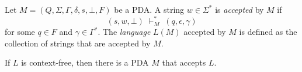 \begin{definition}
  Let $M = (Q, \Sigma, \Gamma, \delta, s, \mathord\perp, F)$ be a
  PDA.
  A string $w \in \Sigma^*$ is \emph{accepted} by $M$ if
  \begin{equation*}
    (s, w, \mathord\perp)
    \; \mathop\vdash\nolimits_M^* \;
    (q, \epsilon, \gamma)
  \end{equation*}
  for some $q \in F$ and $\gamma \in \Gamma^*$.
  The \emph{language} $L(M)$ accepted by $M$ is defined as
  the collection of strings that are accepted by $M$.
\end{definition}

\begin{theorem}
  If $L$ is context-free, then there is a PDA $M$ that accepts $L$.
\end{theorem}
